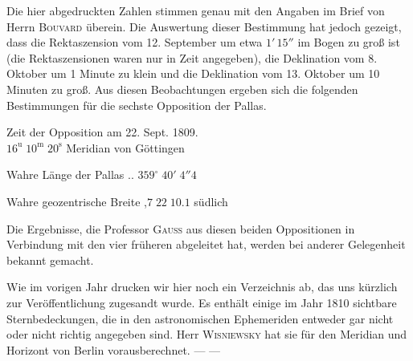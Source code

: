 \par\indent Die hier abgedruckten Zahlen stimmen genau mit den Angaben im Brief von Herrn \textsc{Bouvard} überein. Die Auswertung dieser Bestimmung hat jedoch gezeigt, dass die Rektaszension vom 12. September um etwa $1'\,15''$ im Bogen zu groß ist (die Rektaszensionen waren nur in Zeit angegeben), die Deklination vom 8. Oktober um 1 Minute zu klein und die Deklination vom 13. Oktober um 10 Minuten zu groß. Aus diesen Beobachtungen ergeben sich die folgenden Bestimmungen für die sechste Opposition der Pallas.

\begin{center}Zeit der Opposition am 22. Sept. 1809.\\$16^{\text{u}}\;10^{\text{m}}\;20^{\text{s}}$ Meridian von Göttingen\par Wahre Länge der Pallas .\;.\; $359^\circ\;40'\;4''4$\par Wahre geozentrische Breite ,\quad $7\;22\;10.1$ südlich\end{center}

\par\indent Die Ergebnisse, die Professor \textsc{Gauss} aus diesen beiden Oppositionen in Verbindung mit den vier früheren abgeleitet hat, werden bei anderer Gelegenheit bekannt gemacht.

Wie im vorigen Jahr drucken wir hier noch ein Verzeichnis ab, das uns kürzlich zur Veröffentlichung zugesandt wurde. Es enthält einige im Jahr 1810 sichtbare Sternbedeckungen, die in den astronomischen Ephemeriden entweder gar nicht oder nicht richtig angegeben sind. Herr \textsc{Wisniewsky} hat sie für den Meridian und Horizont von Berlin vorausberechnet. --- ---

